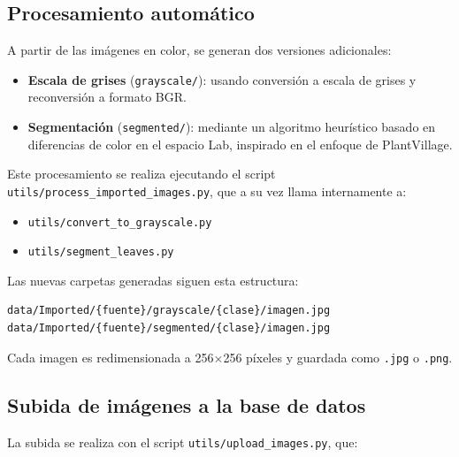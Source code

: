 \documentclass[12pt,a4paper]{article}
\begin{document}
\subsection{Procesamiento automático}

A partir de las imágenes en color, se generan dos versiones adicionales:

\begin{itemize}
    \item \textbf{Escala de grises} (\texttt{grayscale/}): usando conversión a escala de grises y reconversión a formato BGR.
    \item \textbf{Segmentación} (\texttt{segmented/}): mediante un algoritmo heurístico basado en diferencias de color en el espacio Lab, inspirado en el enfoque de PlantVillage.
\end{itemize}

Este procesamiento se realiza ejecutando el script \texttt{utils/process\_imported\_images.py}, que a su vez llama internamente a:

\begin{itemize}
    \item \texttt{utils/convert\_to\_grayscale.py}
    \item \texttt{utils/segment\_leaves.py}
\end{itemize}

Las nuevas carpetas generadas siguen esta estructura:

\begin{verbatim}
data/Imported/{fuente}/grayscale/{clase}/imagen.jpg
data/Imported/{fuente}/segmented/{clase}/imagen.jpg
\end{verbatim}

Cada imagen es redimensionada a 256$\times$256 píxeles y guardada como \texttt{.jpg} o \texttt{.png}.

\subsection{Subida de imágenes a la base de datos}

La subida se realiza con el script \texttt{utils/upload\_images.py}, que:
\end{document}
